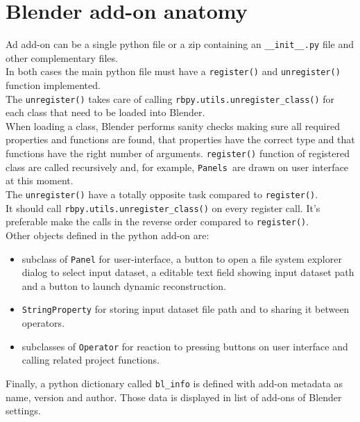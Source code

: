 \section{Blender add-on anatomy}
Ad add-on can be a single python file or a zip containing an \texttt{\_\_init\_\_.py} file and other complementary files. \\
In both cases the main python file must have a \texttt{register()} and \texttt{unregister()} function implemented. \\
The \texttt{unregister()} takes care of calling \texttt{rbpy.utils.unregister\_class()} for each class that need to be loaded into Blender. \\
When loading a class, Blender performs sanity checks making sure all required properties and functions are found, that properties have the correct type and that functions have the right number of arguments. \texttt{register()} function of registered class are called recursively and, for example, \texttt{Panels }are drawn on user interface at this moment. \\
The \texttt{unregister()} have a totally opposite task compared to \texttt{register()}. \\
It should call \texttt{rbpy.utils.unregister\_class()} on every register call. It's preferable make the calls in the reverse order compared to \texttt{register()}. \\
Other objects defined in the python add-on are:
\begin{itemize}
\item subclass of \texttt{Panel} for user-interface, a button to open a file system explorer dialog to select input dataset, a editable text field showing input dataset path and a button to launch dynamic reconstruction.
\item \texttt{StringProperty} for storing input dataset file path and to sharing it between operators.
\item subclasses of \texttt{Operator} for reaction to pressing buttons on user interface and calling related project functions. 
\end{itemize}
Finally, a python dictionary called \texttt{bl\_info} is defined with add-on metadata as name, version and author. Those data is displayed in list of add-ons of Blender settings.


